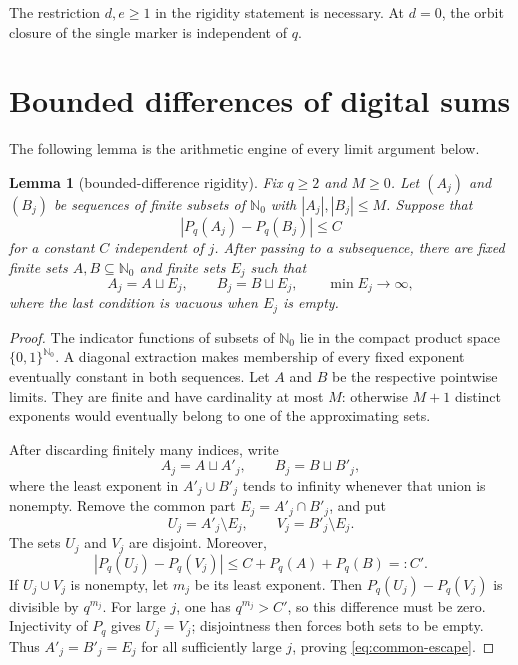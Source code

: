 \documentclass[11pt,a4paper]{amsart}
\newtheorem{lemma}[theorem]{Lemma}
\theoremstyle{definition}
\theoremstyle{remark}
\newcommand{\N}{\mathbb N}
\newcommand{\pq}{P_q}
\begin{document}
The restriction $d,e\geq1$ in the rigidity statement is necessary.  At
$d=0$, the orbit closure of the single marker is independent of $q$.

\section{Bounded differences of digital sums}

The following lemma is the arithmetic engine of every limit argument below.

\begin{lemma}[bounded-difference rigidity]\label{lem:bounded-difference}
Fix $q\geq2$ and $M\geq0$.  Let $(A_j)$ and $(B_j)$ be sequences of finite
subsets of $\N_0$ with $|A_j|,|B_j|\leq M$.  Suppose that
\[
 |\pq(A_j)-\pq(B_j)|\leq C
\]
for a constant $C$ independent of $j$.  After passing to a subsequence,
there are fixed finite sets $A,B\subseteq\N_0$ and finite sets $E_j$ such
that
\begin{equation}\label{eq:common-escape}
 A_j=A\sqcup E_j,
 \qquad B_j=B\sqcup E_j,
 \qquad \min E_j\longrightarrow\infty,
\end{equation}
where the last condition is vacuous when $E_j$ is empty.
\end{lemma}

\begin{proof}
The indicator functions of subsets of $\N_0$ lie in the compact product
space $\{0,1\}^{\N_0}$.  A diagonal extraction makes membership of every
fixed exponent eventually constant in both sequences.  Let $A$ and $B$ be
the respective pointwise limits.  They are finite and have cardinality at
most $M$: otherwise $M+1$ distinct exponents would eventually belong to one
of the approximating sets.

After discarding finitely many indices, write
\[
 A_j=A\sqcup A'_j,
 \qquad B_j=B\sqcup B'_j,
\]
where the least exponent in $A'_j\cup B'_j$ tends to infinity whenever that
union is nonempty.  Remove the common part
$E_j=A'_j\cap B'_j$, and put
\[
 U_j=A'_j\setminus E_j,
 \qquad V_j=B'_j\setminus E_j.
\]
The sets $U_j$ and $V_j$ are disjoint.  Moreover,
\[
 |\pq(U_j)-\pq(V_j)|
 \leq C+\pq(A)+\pq(B)=:C'.
\]
If $U_j\cup V_j$ is nonempty, let $m_j$ be its least exponent.  Then
$\pq(U_j)-\pq(V_j)$ is divisible by $q^{m_j}$.  For large $j$, one has
$q^{m_j}>C'$, so this difference must be zero.  Injectivity of $\pq$ gives
$U_j=V_j$; disjointness then forces both sets to be empty.  Thus
$A'_j=B'_j=E_j$ for all sufficiently large $j$, proving
\eqref{eq:common-escape}.
\end{proof}
\end{document}
